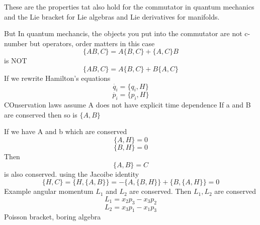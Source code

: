These are the properties tat also hold for the commutator in quantum mechanics and the Lie bracket for Lie algebras and Lie derivatives for manifolds.

But In quantum mechancis, the objects you put into the commutator are not c-number but operators, order matters in this case
\begin{equation}
\{AB, C\} = A\{B, C\}+ \{A, C\} B
\end{equation}
is NOT
\begin{equation}
\{AB, C\} = A\{B, C\}+ B\{A, C\} 
\end{equation}
If we rewrite Hamilton's equations
\begin{equation}
\dot{q_i} = \{q_i, H\}
\end{equation}
\begin{equation}
\dot{p_i} = \{ p_i, H\}
\end{equation}
 COnservation laws assume A does not have explicit time dependence
If a and B are conserved then so is $\{A, B\}$

If we have A and b which are conserved
\begin{equation}
\{A, H\} = 0
\end{equation}
\begin{equation}
\{B, H\} = 0
\end{equation}
Then 
\begin{equation}
\{A, B\} = C
\end{equation}
is also conserved. using the Jacoibe identity
\begin{equation}
\{H, C\} = \{H, \{A, B\}\} = -\{A, \{B, H\}\} + \{B, \{A, H\}\} = 0
\end{equation}
Example angular momentum $L_1$ and $L_2$ are conserved. Then ${L_1, L_2}$ are conserved
\begin{equation}
L_1 = x_2p_3 - x_3p_2
\end{equation}
\begin{equation}
L_2 = x_3 p_1 - x_1p_3
\end{equation}
Poisson bracket, boring algebra

